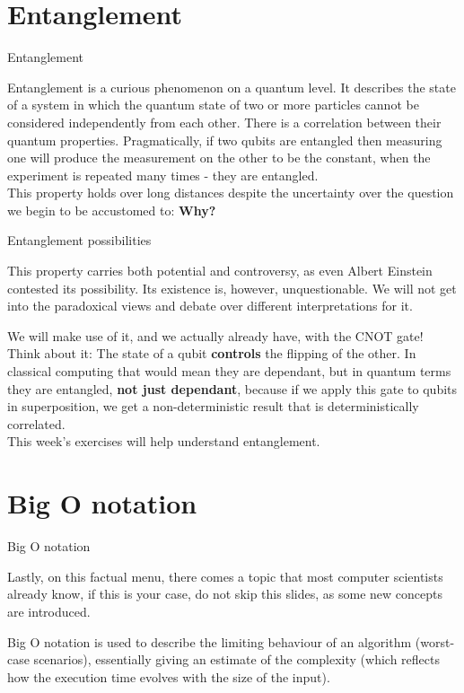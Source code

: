 \documentclass[aspectratio=43]{beamer}
\begin{document}
\section{Entanglement}
\begin{frame}{Entanglement}
\begin{card}
    Entanglement is a curious phenomenon on a quantum level. It describes the state of a system in which the quantum state of two or more particles cannot be considered independently from each other. There is a correlation between their quantum properties. Pragmatically, if two qubits are entangled then measuring one will produce the measurement on the other to be the constant, when the experiment is repeated many times - they are entangled.\\ This property holds over long distances despite the uncertainty over the question we begin to be accustomed to: \textbf{Why?}
\end{card}
\pagenumber
\end{frame}

\begin{frame}{Entanglement possibilities}
\begin{cardTiny}
    This property carries both potential and controversy, as even Albert Einstein contested its possibility. Its existence is, however, unquestionable. We will not get into the paradoxical views and debate over different interpretations for it.
\end{cardTiny}
\begin{cardTiny}
    We will make use of it, and we actually already have, with the CNOT gate! Think about it: The state of a qubit \textbf{controls} the flipping of the other. In classical computing that would mean they are dependant, but in quantum terms they are entangled, \textbf{not just dependant}, because if we apply this gate to qubits in superposition, we get a non-deterministic result that is deterministically correlated.\\
    \small{This week's exercises will help understand entanglement.}
\end{cardTiny}
\pagenumber
\end{frame}

\section{Big O notation}
\begin{frame}{Big O notation}
\begin{card}
Lastly, on this factual menu, there comes a topic that most computer scientists already know, if this is your case, do not skip this slides, as some new concepts are introduced.
\end{card}
\begin{card}
Big O notation is used to describe the limiting behaviour of an algorithm (worst-case scenarios), essentially giving an estimate of the complexity (which reflects how the execution time evolves with the size of the input). 
\end{card}
\pagenumber
\end{frame}
\end{document}
